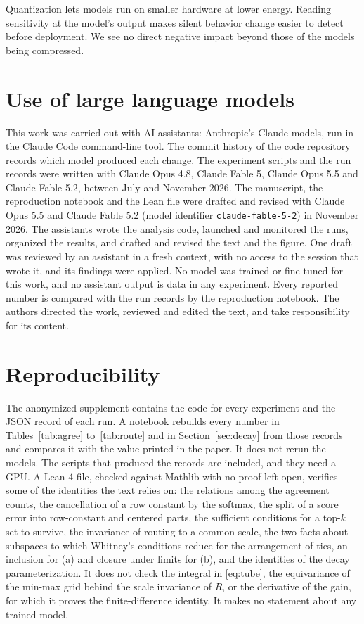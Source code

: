 \documentclass[10pt]{article}
\begin{document}
Quantization lets models run on smaller hardware at lower energy. Reading sensitivity at the
model's output makes silent behavior change easier to detect before deployment. We see no direct
negative impact beyond those of the models being compressed.

\section*{Use of large language models}

This work was carried out with AI assistants: Anthropic's Claude models, run in the Claude Code
command-line tool. The commit history of the code repository records which model produced each
change. The experiment scripts and the run records were written with Claude Opus 4.8, Claude
Fable 5, Claude Opus 5.5 and Claude Fable 5.2, between July and November 2026. The manuscript,
the reproduction notebook and the Lean file were drafted and revised with Claude Opus 5.5 and
Claude Fable 5.2 (model identifier \texttt{claude-fable-5-2}) in November 2026. The assistants
wrote the analysis code, launched and monitored the runs, organized the results, and drafted and
revised the text and the figure. One draft was reviewed by an assistant in a fresh context, with
no access to the session that wrote it, and its findings were applied. No model was trained or
fine-tuned for this work, and no assistant output is data in any experiment. Every reported
number is compared with the run records by the reproduction notebook. The authors directed the
work, reviewed and edited the text, and take responsibility for its content.

\section*{Reproducibility}

The anonymized supplement contains the code for every experiment and the JSON record of each run.
A notebook rebuilds every number in Tables~\ref{tab:agree} to~\ref{tab:route} and in
Section~\ref{sec:decay} from those records and compares it with the value printed in the paper.
It does not rerun the models. The scripts that produced the records are included, and they need a
GPU. A Lean 4 file, checked against Mathlib with no proof left open, verifies some of the identities
the text relies on: the relations among the agreement counts, the cancellation of a row constant by
the softmax, the split of a score error into row-constant and centered parts, the sufficient
conditions for a top-$k$ set to survive, the invariance of routing to a common scale, the two
facts about subspaces to which Whitney's conditions reduce for the arrangement of ties, an
inclusion for (a) and closure under limits for (b), and the
identities of the decay parameterization. It does not check the integral in
\eqref{eq:tube}, the equivariance of the min-max grid behind the scale invariance of $R$, or the
derivative of the gain, for which it proves the finite-difference identity. It makes no statement about any trained model.
\end{document}
